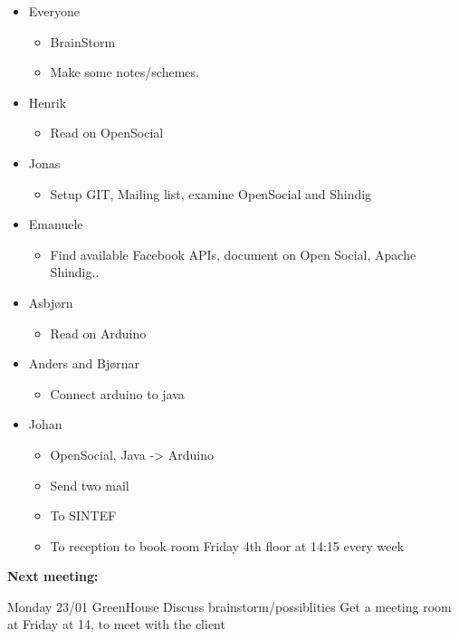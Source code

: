 \begin{itemize}
	\item Everyone
	\begin{itemize}
		\item BrainStorm
		\item Make some notes/schemes.
	\end{itemize}

	\item Henrik
	\begin{itemize}
		\item Read on OpenSocial
	\end{itemize}

	\item Jonas
	\begin{itemize}
		\item Setup GIT, Mailing list, examine OpenSocial and Shindig
	\end{itemize}

	\item Emanuele
	\begin{itemize}
		\item Find available Facebook APIs, document on Open Social, Apache Shindig..
	\end{itemize}

	\item Asbjørn
	\begin{itemize}
		\item Read on Arduino
	\end{itemize}

	\item Anders and Bjørnar
	\begin{itemize}
		\item Connect arduino to java
	\end{itemize}

	\item Johan
	\begin{itemize}
		\item OpenSocial, Java -> Arduino
		\item Send two mail
		\item To SINTEF
		\item To reception to book room Friday 4th floor at 14:15 every week
	\end{itemize}
\end{itemize}


\textbf{Next meeting:}

Monday 23/01 GreenHouse\newline
Discuss brainstorm/possiblities\newline
Get a meeting room at Friday at 14, to meet with the client


